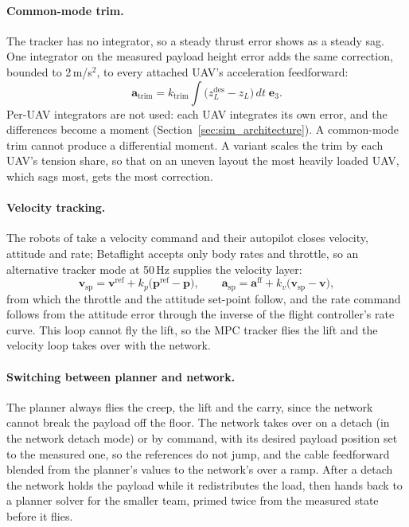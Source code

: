 \paragraph{Common-mode trim.} The tracker has no integrator, so a steady thrust error shows as a steady
sag. One integrator on the measured payload height error adds the same correction, bounded to
2\,m/s$^2$, to every attached UAV's acceleration feedforward:
\begin{equation}
    \mathbf{a}_{\mathrm{trim}} = k_{\mathrm{trim}} \int \big(z_L^{\mathrm{des}} - z_L\big)\, dt\; \mathbf{e}_3 .
\end{equation}
Per-UAV integrators are not used: each UAV integrates its own
error, and the differences become a moment (Section~\ref{sec:sim_architecture}). A common-mode trim cannot produce a differential moment.
A variant scales the trim by each UAV's tension share, so that on an uneven layout the most heavily
loaded UAV, which sags most, gets the most correction.

\paragraph{Velocity tracking.} The robots of \cite{quan2025swarm} take a velocity command and their
autopilot closes velocity, attitude and rate; Betaflight accepts only body rates and throttle, so an
alternative tracker mode at 50\,Hz supplies the velocity layer:
\begin{equation}
    \mathbf{v}_{\mathrm{sp}} = \mathbf{v}^{\mathrm{ref}} + k_p\big(\mathbf{p}^{\mathrm{ref}} - \mathbf{p}\big),
    \qquad
    \mathbf{a}_{\mathrm{sp}} = \mathbf{a}^{\mathrm{ff}} + k_v\big(\mathbf{v}_{\mathrm{sp}} - \mathbf{v}\big),
\end{equation}
from which the throttle and the attitude set-point follow, and the rate command follows from the
attitude error through the inverse of the flight controller's rate curve. This loop cannot fly the lift,
so the MPC tracker flies the lift and the velocity loop takes over with the network.

\paragraph{Switching between planner and network.} The planner always flies the creep, the lift and the
carry, since the network cannot break the payload off the floor. The network takes over on a detach (in
the network detach mode) or by command, with its desired payload position set to the measured one, so the
references do not jump, and the cable feedforward blended from the planner's values to the network's over
a ramp. After a detach the network holds the payload while it redistributes the load, then hands back to a
planner solver for the smaller team, primed twice from the measured state before it flies.
